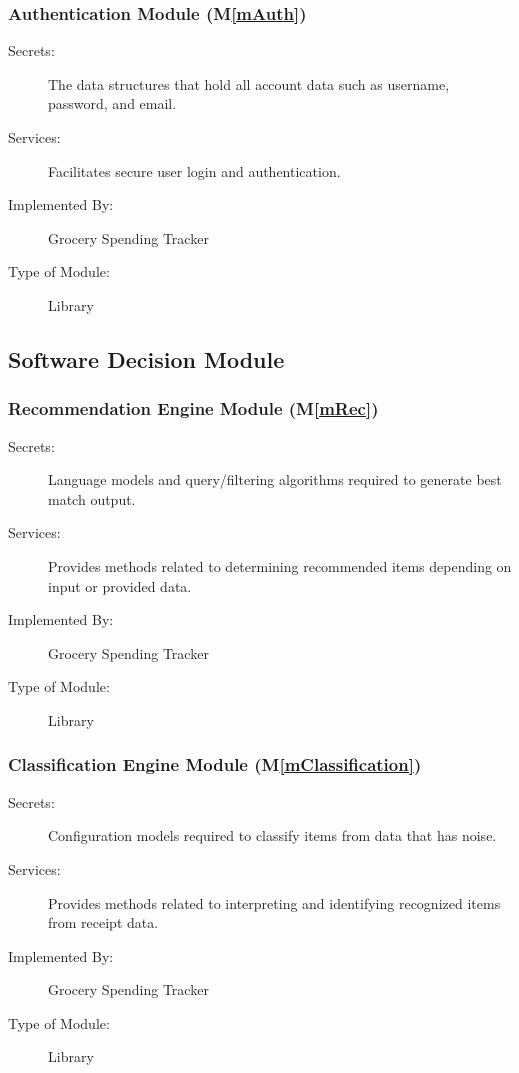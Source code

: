\documentclass[12pt, titlepage]{article}
\newcommand{\mref}[1]{M\ref{#1}}
\begin{document}
\subsubsection{Authentication Module (\mref{mAuth})}

\begin{description}
\item[Secrets:] The data structures that hold all account data such as username, password, and email.
\item[Services:] Facilitates secure user login and authentication.
\item[Implemented By:] Grocery Spending Tracker
\item[Type of Module:] Library
\end{description}

\subsection{Software Decision Module}

\subsubsection{Recommendation Engine Module (\mref{mRec})}

\begin{description}
\item[Secrets:] Language models and query/filtering algorithms required to generate best match output.
\item[Services:] Provides methods related to determining recommended items depending on input or provided data.
\item[Implemented By:] Grocery Spending Tracker
\item[Type of Module:] Library
\end{description}

\subsubsection{Classification Engine Module (\mref{mClassification})}

\begin{description}
\item[Secrets:] Configuration models required to classify items from data that has noise.
\item[Services:] Provides methods related to interpreting and identifying recognized items from receipt data.
\item[Implemented By:] Grocery Spending Tracker
\item[Type of Module:] Library
\end{description}
\end{document}
